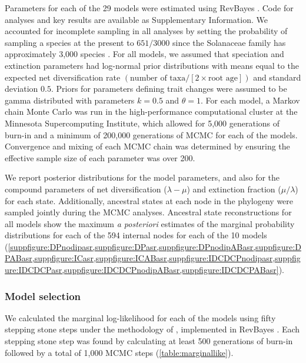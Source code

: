 Parameters for each of the 29 models were estimated using RevBayes \citep{hoehna_2016}.
Code for analyses and key results are available as Supplementary Information. %
We accounted for incomplete sampling in all analyses by setting the probability of sampling a species at the present to $651/3000$ \citep[using the method of][]{fitzjohn_2009} since the Solanaceae family has approximately 3,000 species \citep{solsource}.
For all models, we assumed that speciation and extinction parameters had log-normal prior distributions with means equal to the expected net diversification rate $(\text{number of taxa} / [2 \times \text{root age}])$ and standard deviation $0.5$.
Priors for parameters defining trait changes were assumed to be gamma distributed with parameters $k=0.5$ and $\theta=1$. 
For each model, a Markov chain Monte Carlo \citep[MCMC;][]{metropolis1953equation,Hastings1970} was run in the high-performance computational cluster at the Minnesota Supercomputing Institute, which allowed for 5,000 generations of burn-in and a minimum of 200,000 generations of MCMC for each of the  models. %
Convergence and mixing of each MCMC chain was determined by ensuring the effective sample size of each parameter was over 200.

We report posterior distributions for the model parameters, and also for the compound parameters of net diversification ($\lambda - \mu$) and extinction fraction ($\mu / \lambda$) for each state.
Additionally, ancestral states at each node in the phylogeny were sampled jointly during the MCMC analyses.
Ancestral state reconstructions for all models show the maximum \emph{a posteriori} estimates of the marginal probability distributions for each of the 594 internal nodes for each of the 10 models (\cref{suppfigure:DPnodipasr,suppfigure:DPasr,suppfigure:DPnodipABasr,suppfigure:DPABasr,suppfigure:ICasr,suppfigure:ICABasr,suppfigure:IDCDCPnodipasr,suppfigure:IDCDCPasr,suppfigure:IDCDCPnodipABasr,suppfigure:IDCDCPABasr}). %

\subsubsection{Model selection}

We calculated the marginal log-likelihood for each of the models using fifty stepping stone steps under the methodology of \citet{xie_2010}, implemented in RevBayes \citep{hoehna_2016}.
Each stepping stone step was found by calculating at least 500 generations of burn-in followed by a total of 1,000 MCMC steps (\cref{table:marginallike}).

